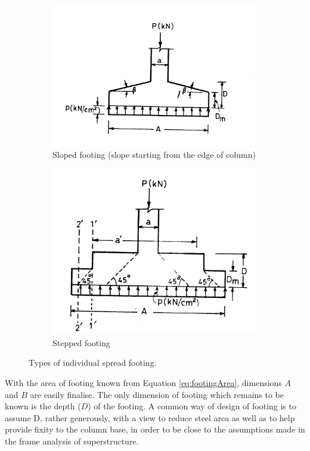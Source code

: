 \documentclass{report}
\newcommand{\equmacro}[1] {Equation #1}
\begin{document}
\begin{figure}
\begin{subfigure}[b]{0.5\textwidth}
    \includegraphics[width=\textwidth]{images/fig2293.png}
    \caption{Sloped footing (slope starting from the edge of column)}
    \label{slopefooting}
  \end{subfigure}
\begin{subfigure}[b]{0.5\textwidth}
    \includegraphics[width=\textwidth]{images/fig2294.png}
    \caption{Stepped footing}
    \label{steppedfooting}
  \end{subfigure}
\caption{Types of individual spread footing.}
\label{Types-of-individual-spread-footing}
\end{figure}
With the area of footing known from \equmacro \ref{eq:footingArea},
dimensions $A$ and $B$ are easily finalise.  The only dimension of footing
which remains to be known is the depth ($D$) of the footing.  A common way
of design of footing is to assume D, rather generously, with a view to
reduce steel area as well as to help provide fixity to the column base, in
order to be close to the assumptions made in the frame analysis of
superstructure.
\end{document}
